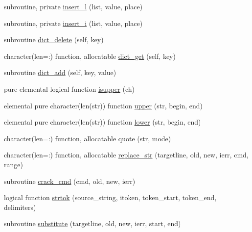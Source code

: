 \begin{DoxyCompactItemize}
subroutine, private \mbox{\hyperlink{namespacem__cli_a0c1b22c46470afbb4ee5c67180335578}{insert\+\_\+l}} (list, value, place)
\item 
subroutine, private \mbox{\hyperlink{namespacem__cli_a841685591ef1f1827fc1fe32a7f546f1}{insert\+\_\+i}} (list, value, place)
\item 
subroutine \mbox{\hyperlink{namespacem__cli_aff32e44070983c7fb4eb0a3b1dea7a6d}{dict\+\_\+delete}} (self, key)
\item 
character(len=\+:) function, allocatable \mbox{\hyperlink{namespacem__cli_ac4a889309ffc333af6bf8e11f1fc4869}{dict\+\_\+get}} (self, key)
\item 
subroutine \mbox{\hyperlink{namespacem__cli_a1be098e2b920e8d50ed14be03a3133db}{dict\+\_\+add}} (self, key, value)
\item 
pure elemental logical function \mbox{\hyperlink{namespacem__cli_a4c126288dc18289b2095a0882f10ca77}{isupper}} (ch)
\item 
elemental pure character(len(str)) function \mbox{\hyperlink{namespacem__cli_aef6f54c9cb37251dfd664c0845186a40}{upper}} (str, begin, end)
\item 
elemental pure character(len(str)) function \mbox{\hyperlink{namespacem__cli_a685574282a09c3f57e0c18654a3a642c}{lower}} (str, begin, end)
\item 
character(len=\+:) function, allocatable \mbox{\hyperlink{namespacem__cli_ac82fec2a5441020701fe3c64af3d9948}{quote}} (str, mode)
\item 
character(len=\+:) function, allocatable \mbox{\hyperlink{namespacem__cli_a40e02b1c9fc580ddd410bb24017fab8c}{replace\+\_\+str}} (targetline, old, new, ierr, cmd, range)
\item 
subroutine \mbox{\hyperlink{namespacem__cli_a8d5d1954aac6494e07fb11f12f635c85}{crack\+\_\+cmd}} (cmd, old, new, ierr)
\item 
logical function \mbox{\hyperlink{namespacem__cli_a0015c38f9fa45a58ba6ae89f2ddb54f1}{strtok}} (source\+\_\+string, itoken, token\+\_\+start, token\+\_\+end, delimiters)
\item 
subroutine \mbox{\hyperlink{namespacem__cli_a3b66fe9cee0e084068051636afb2957d}{substitute}} (targetline, old, new, ierr, start, end)
\end{DoxyCompactItemize}
